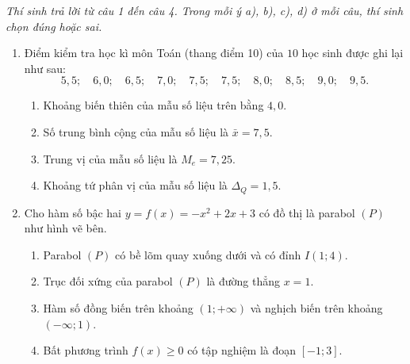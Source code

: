 \documentclass[10pt,a4paper]{article}
\newcommand{\parttitle}[1]{\par\vspace{3.5pt}\needspace{3\baselineskip}{\large\bfseries\color{ink}#1}\par\nopagebreak\vspace{2pt}}
\begin{document}
\vspace{3pt}
\parttitle{PHẦN II. Câu trắc nghiệm đúng sai}
\textit{Thí sinh trả lời từ câu 1 đến câu 4. Trong mỗi ý a), b), c), d) ở mỗi câu, thí sinh chọn đúng hoặc sai.}
\begin{enumerate}
\item Điểm kiểm tra học kì môn Toán (thang điểm 10) của $10$ học sinh được ghi lại như sau:
$$5{,}5;\quad 6{,}0;\quad 6{,}5;\quad 7{,}0;\quad 7{,}5;\quad 7{,}5;\quad 8{,}0;\quad 8{,}5;\quad 9{,}0;\quad 9{,}5.$$
\begin{enumerate}
    \item Khoảng biến thiên của mẫu số liệu trên bằng $4{,}0$.
    \item Số trung bình cộng của mẫu số liệu là $\bar{x} = 7{,}5$.
    \item Trung vị của mẫu số liệu là $M_e = 7{,}25$.
    \item Khoảng tứ phân vị của mẫu số liệu là $\Delta_Q = 1{,}5$.
\end{enumerate}

\item Cho hàm số bậc hai $y = f(x) = -x^2 + 2x + 3$ có đồ thị là parabol $(P)$ như hình vẽ bên.
\par\noindent\begin{minipage}[t]{0.70\linewidth}
\begin{enumerate}
    \item Parabol $(P)$ có bề lõm quay xuống dưới và có đỉnh $I(1; 4)$.
    \item Trục đối xứng của parabol $(P)$ là đường thẳng $x = 1$.
    \item Hàm số đồng biến trên khoảng $(1; +\infty)$ và nghịch biến trên khoảng $(-\infty; 1)$.
    \item Bất phương trình $f(x) \ge 0$ có tập nghiệm là đoạn $[-1; 3]$.
\end{enumerate}
\end{minipage}\hfill
\begin{minipage}[t]{0.28\linewidth}\raggedleft\vspace{-4pt}
\end{minipage}


\end{enumerate}
\end{document}
